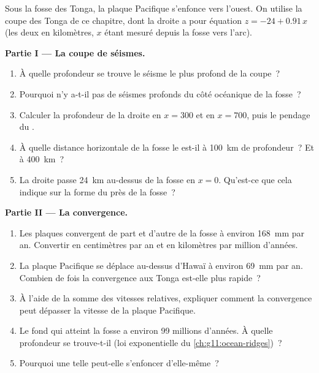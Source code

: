 \begin{problem}
\label{pb:g11:subduction-zones:1}
Sous la fosse des Tonga, la plaque Pacifique s'enfonce vers l'ouest. On
utilise la coupe des Tonga de ce chapitre, dont la droite a pour équation
$z = -24 + 0.91\,x$ (les deux en
kilomètres, $x$ étant mesuré depuis la fosse vers l'arc).

\medskip
\noindent\textbf{Partie I --- La coupe de séismes.}
\begin{enumerate}
  \item À quelle profondeur se trouve le séisme le plus profond de la
        coupe~?
  \item Pourquoi n'y a-t-il pas de séismes profonds du côté océanique de la
        fosse~?
  \item Calculer la profondeur de la droite en $x = 300$ et en $x = 700$,
        puis le pendage du .
  \item À quelle distance horizontale de la fosse le 
        est-il à \qty{100}{km} de profondeur~? Et à \qty{400}{km}~?
  \item La droite passe \qty{24}{km} au-dessus de la fosse en $x = 0$.
        Qu'est-ce que cela indique sur la forme du  près
        de la fosse~?
\end{enumerate}

\medskip
\noindent\textbf{Partie II --- La convergence.}
\begin{enumerate}[resume]
  \item Les plaques convergent de part et d'autre de la fosse à environ
        \qty{168}{mm} par an. Convertir en centimètres par an et en
        kilomètres par million d'années.
  \item La plaque Pacifique se déplace au-dessus d'Hawaï à environ
        \qty{69}{mm} par an. Combien de fois la convergence aux Tonga
        est-elle plus rapide~?
  \item À l'aide de la somme des vitesses relatives, expliquer comment la
        convergence peut dépasser la vitesse de la plaque Pacifique.
  \item Le fond qui atteint la fosse a environ 99 millions d'années. À
        quelle profondeur se trouve-t-il (loi exponentielle du
        \cref{ch:g11:ocean-ridges})~?
  \item Pourquoi une telle  peut-elle s'enfoncer d'elle-même~?
\end{enumerate}


\end{problem}

